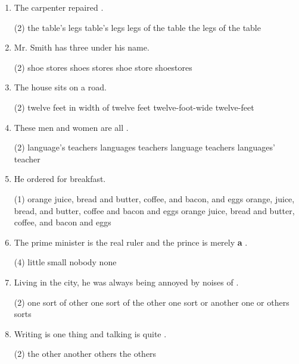 \begin{enumerate}
\item The carpenter repaired \ttu.
  \begin{tasks}(2)
    \task the table's legs
    \task table's legs
    \task legs of the table
    \task the legs of the table
  \end{tasks}

\item Mr. Smith has three \ttu under his name.
  \begin{tasks}(2)
    \task shoe stores \task shoes stores \task shoe store \task shoestores
  \end{tasks}

\item The house sits on a \ttu road.
  \begin{tasks}(2)
    \task twelve feet in width
    \task of twelve feet
    \task twelve-foot-wide
    \task twelve-feet
  \end{tasks}

\item These men and women are all \ttu .
  \begin{tasks}(2)
    \task language's teachers \task languages teachers
    \task language teachers \task languages' teacher
  \end{tasks}

\item He ordered  \ttu for breakfast.
  \begin{tasks}(1)
    \task orange juice, bread and butter, coffee, and bacon, and eggs
    \task orange, juice, bread, and butter, coffee and bacon and eggs
    \task orange juice, bread and butter, coffee, and bacon and eggs
  \end{tasks}

\item The prime minister is the real ruler and the prince is merely \textbf{a} \ttu .
  \begin{tasks}(4)
    \task little
    \task small
    \task nobody
    \task none
  \end{tasks}

\item Living in the city, he was always being annoyed by noises of  \ttu .
  \begin{tasks}(2)
    \task one sort of other
    \task one sort of the other
    \task one sort or another
    \task one or others sorts
  \end{tasks}

\item Writing is one thing and talking is quite \ttu .
  \begin{tasks}(2)
    \task the other
    \task another
    \task others
    \task the others
  \end{tasks}


\end{enumerate}

